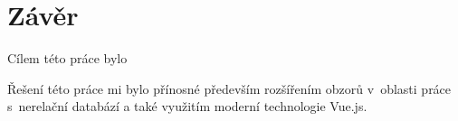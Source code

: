 \chapter{Závěr}
Cílem této práce bylo \blindtext

\blindtext %

Řešení této práce mi bylo přínosné především rozšířením obzorů v~oblasti práce s~nerelační databází a také využitím moderní technologie Vue.js.